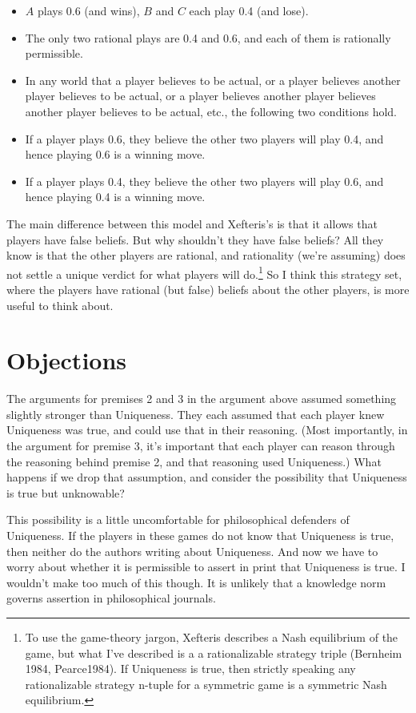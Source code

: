 \documentclass[
  11pt,
]{article}
\providecommand{\tightlist}{%
  \setlength{\itemsep}{0pt}\setlength{\parskip}{0pt}}
\begin{document}
\begin{itemize}
\tightlist
\item
  \(A\) plays 0.6 (and wins), \(B\) and \(C\) each play 0.4 (and lose).
\item
  The only two rational plays are 0.4 and 0.6, and each of them is rationally permissible.
\item
  In any world that a player believes to be actual, or a player believes another player believes to be actual, or a player believes another player believes another player believes to be actual, etc., the following two conditions hold.
\item
  If a player plays 0.6, they believe the other two players will play 0.4, and hence playing 0.6 is a winning move.
\item
  If a player plays 0.4, they believe the other two players will play 0.6, and hence playing 0.4 is a winning move.
\end{itemize}

The main difference between this model and Xefteris's is that it allows that players have false beliefs. But why shouldn't they have false beliefs? All they know is that the other players are rational, and rationality (we're assuming) does not settle a unique verdict for what players will do.\footnote{To use the game-theory jargon, Xefteris describes a Nash equilibrium of the game, but what I've described is a a rationalizable strategy triple (Bernheim 1984, Pearce1984). If Uniqueness is true, then strictly speaking any rationalizable strategy n-tuple for a symmetric game is a symmetric Nash equilibrium.} So I think this strategy set, where the players have rational (but false) beliefs about the other players, is more useful to think about.

\section{Objections}\label{objections}

The arguments for premises 2 and 3 in the argument above assumed something slightly stronger than Uniqueness. They each assumed that each player knew Uniqueness was true, and could use that in their reasoning. (Most importantly, in the argument for premise 3, it's important that each player can reason through the reasoning behind premise 2, and that reasoning used Uniqueness.) What happens if we drop that assumption, and consider the possibility that Uniqueness is true but unknowable?

This possibility is a little uncomfortable for philosophical defenders of Uniqueness. If the players in these games do not know that Uniqueness is true, then neither do the authors writing about Uniqueness. And now we have to worry about whether it is permissible to assert in print that Uniqueness is true. I wouldn't make too much of this though. It is unlikely that a knowledge norm governs assertion in philosophical journals.
\end{document}
